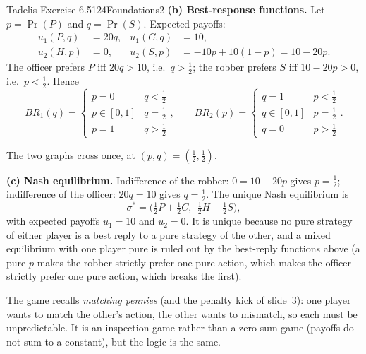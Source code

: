 \begin{exsol}{Tadelis Exercise 6.5}{124}{Foundations}{2}
\textbf{(b) Best-response functions.} Let $p = \Pr(P)$ and $q = \Pr(S)$. Expected payoffs:
\begin{align*}
  u_1(P, q) &= 20q, & u_1(C, q) &= 10, \\
  u_2(H, p) &= 0, & u_2(S, p) &= -10p + 10(1-p) = 10 - 20p.
\end{align*}
The officer prefers $P$ iff $20q > 10$, i.e.\ $q > \frac12$; the robber prefers $S$ iff $10 - 20p > 0$,
i.e.\ $p < \frac12$. Hence
\[
  BR_1(q) = \begin{cases} p = 0 & q < \frac12\\ p \in [0,1] & q = \frac12\\ p = 1 & q > \frac12\end{cases},
  \qquad
  BR_2(p) = \begin{cases} q = 1 & p < \frac12\\ q \in [0,1] & p = \frac12\\ q = 0 & p > \frac12\end{cases}.
\]
\begin{center}
\end{center}
The two graphs cross once, at $(p,q) = (\frac12,\frac12)$.

\textbf{(c) Nash equilibrium.} Indifference of the robber: $0 = 10 - 20p$ gives $p = \frac12$;
indifference of the officer: $20q = 10$ gives $q = \frac12$. The unique Nash equilibrium is
\[
  \sigma^* = \bigl(\tfrac12 P + \tfrac12 C,\ \ \tfrac12 H + \tfrac12 S\bigr),
\]
with expected payoffs $u_1 = 10$ and $u_2 = 0$. It is unique because no pure strategy of either player
is a best reply to a pure strategy of the other, and a mixed equilibrium with one player pure is
ruled out by the best-reply functions above (a pure $p$ makes the robber strictly prefer one pure
action, which makes the officer strictly prefer one pure action, which breaks the first).

The game recalls \emph{matching pennies} (and the penalty kick of slide~3): one player wants to
match the other's action, the other wants to mismatch, so each must be unpredictable. It is an
inspection game rather than a zero-sum game (payoffs do not sum to a constant), but the logic is the same.


\end{exsol}
